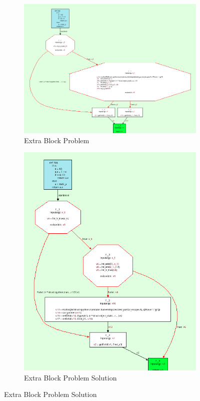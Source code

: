 \begin{figure}[h]
\begin{subfigure}{0.6\textwidth}
\centering
\includegraphics[width=\textwidth]{needs-extra-block-bef.png}
\caption{Extra Block Problem}
\label{figure-8:a}
\end{subfigure}
\begin{subfigure}{0.4\textwidth}
\centering
\includegraphics[width=1.05\textwidth]{needs-extra-block-after.png}
\caption{Extra Block Problem Solution}
\label{figure-8:b}
\end{subfigure}
\end{figure}


